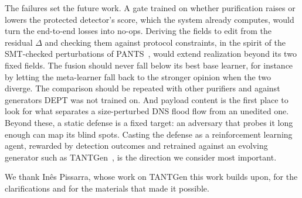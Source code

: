 \documentclass[acmtog,nonacm,pbalance]{acmart}
\begin{document}
The failures set the future work. A gate trained on whether purification
raises or lowers the protected detector's score, which the system already
computes, would turn the end-to-end losses into no-ops. Deriving the fields to
edit from the residual $\Delta$ and checking them against protocol constraints,
in the spirit of the SMT-checked perturbations of
PANTS~\cite{jin2025robustifying}, would extend realization beyond its two fixed
fields. The fusion should never fall below its best base learner, for instance
by letting the meta-learner fall back to the stronger opinion when the two
diverge. The comparison should be repeated with other purifiers and against
generators DEPT was not trained on. And payload content is the first place to
look for what separates a size-perturbed DNS flood flow from an unedited one.
Beyond these, a static defense is a fixed target: an adversary that probes it
long enough can map its blind spots. Casting the defense as a reinforcement
learning agent, rewarded by detection outcomes and retrained against an evolving
generator such as TANTGen~\cite{sutton2018reinforcement,nguyen2021deep}, is the
direction we consider most important.

\begin{acks}
We thank Inês Pissarra, whose work on TANTGen this work builds upon, for the
clarifications and for the materials that made it possible.
\end{acks}



\end{document}
